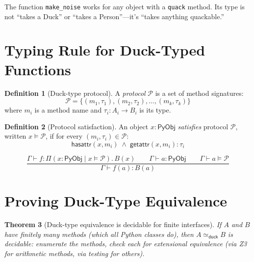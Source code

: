 \documentclass[11pt,a4paper]{report}
\theoremstyle{definition}
\newtheorem{definition}{Definition}[chapter]
\theoremstyle{plain}
\newtheorem{theorem}[definition]{Theorem}
\newcommand{\PyObj}{\mathsf{PyObj}}
\begin{document}
The function \lstinline[style=python]{make_noise} works for any object with a
\lstinline[style=python]{quack} method. Its type is not ``takes a Duck'' or
``takes a Person''---it's ``takes anything quackable.''

\section{Typing Rule for Duck-Typed Functions}

\begin{definition}[Duck-type protocol]
A \emph{protocol} $\mathcal{P}$ is a set of method signatures:
\[
  \mathcal{P} = \{(m_1, \tau_1), (m_2, \tau_2), \ldots, (m_k, \tau_k)\}
\]
where $m_i$ is a method name and $\tau_i : A_i \to B_i$ is its type.
\end{definition}

\begin{definition}[Protocol satisfaction]
An object $x : \PyObj$ \emph{satisfies} protocol $\mathcal{P}$, written
$x \models \mathcal{P}$, if for every $(m_i, \tau_i) \in \mathcal{P}$:
\[
  \mathsf{hasattr}(x, m_i) \;\wedge\; \mathsf{getattr}(x, m_i) : \tau_i
\]
\end{definition}

\[
  \frac{
    \Gamma \vdash f : \Pi(x : \PyObj \mid x \models \mathcal{P}).\, B(x)
    \qquad
    \Gamma \vdash a : \PyObj
    \qquad
    \Gamma \vdash a \models \mathcal{P}
  }{
    \Gamma \vdash f(a) : B(a)
  }
\]

\section{Proving Duck-Type Equivalence}

\begin{theorem}[Duck-type equivalence is decidable for finite interfaces]
If $A$ and $B$ have finitely many methods (which all Python classes do), then
$A \simeq_{\mathsf{duck}} B$ is decidable: enumerate the methods, check each
for extensional equivalence (via Z3 for arithmetic methods, via testing for
others).
\end{theorem}
\end{document}
